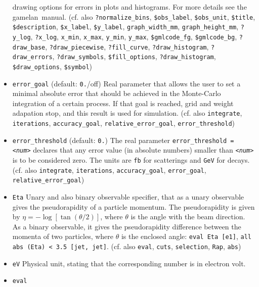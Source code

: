 \documentclass[12pt]{book}
\newcommand{\ttt}[1]{\texttt{#1}}
\newcommand{\gamelan}{\textsf{gamelan}}
\begin{document}
\begin{itemize}
drawing options for errors in plots and histograms. For more details
see the \gamelan\ manual. (cf. also
\ttt{?normalize\_bins}, \ttt{\$obs\_label}, \ttt{\$obs\_unit}, 
\ttt{\$title}, \ttt{\$description}, \ttt{\$x\_label},
\ttt{\$y\_label}, \ttt{graph\_width\_mm}, \ttt{graph\_height\_mm},
\ttt{?y\_log}, \ttt{?x\_log}, \ttt{x\_min}, \ttt{x\_max}, 
\ttt{y\_min}, \ttt{y\_max}, \ttt{\$gmlcode\_fg}, \ttt{\$gmlcode\_bg},
\ttt{?draw\_base}, \ttt{?draw\_piecewise},
\ttt{?fill\_curve}, \ttt{?draw\_histogram}, \ttt{?draw\_errors},
\newline \ttt{?draw\_symbols}, \ttt{\$fill\_options}, \ttt{?draw\_histogram},
\ttt{\$draw\_options}, \ttt{\$symbol})
\item
\ttt{error\_goal} \qquad (default: \ttt{0.}/off) \newline
Real parameter that allows the user to set a minimal absolute error
that should be achieved in the Monte-Carlo integration of a certain 
process. If that goal is reached, grid and weight adapation stop, and
this result is used for simulation. (cf. also \ttt{integrate},
\ttt{iterations}, \ttt{accuracy\_goal}, \ttt{relative\_error\_goal},
\ttt{error\_threshold}) 
\item
\ttt{error\_threshold} \qquad (default: \ttt{0.}) \newline
The real parameter \ttt{error\_threshold = {\em <num>}} declares that any
error value (in absolute numbers) smaller than \ttt{{\em <num>}} is to be
considered zero. The units are \ttt{fb} for scatterings and \ttt{GeV}
for decays. (cf. also \ttt{integrate}, \ttt{iterations},
\ttt{accuracy\_goal}, \ttt{error\_goal}, \ttt{relative\_error\_goal}) 
\item
\ttt{Eta} \newline
Unary and also binary observable specifier, that as a unary observable
gives the pseudorapidity of a particle momentum. The pseudorapidity is
given by $\eta = - \log \left[ \tan (\theta/2) \right]$, where
$\theta$ is the angle with the beam direction. As a binary
observable, it gives the pseudorapidity difference between the momenta
of two particles, where $\theta$ is the enclosed angle: \ttt{eval Eta
[e1]},  \ttt{all abs (Eta) < 3.5 [jet, jet]}. (cf. also \ttt{eval},
\ttt{cuts}, \ttt{selection}, \ttt{Rap}, \ttt{abs})  
\item
\ttt{eV} \newline
Physical unit, stating that the corresponding number is in electron volt.
\item
\ttt{eval} \newline

\end{itemize}
\end{document}
